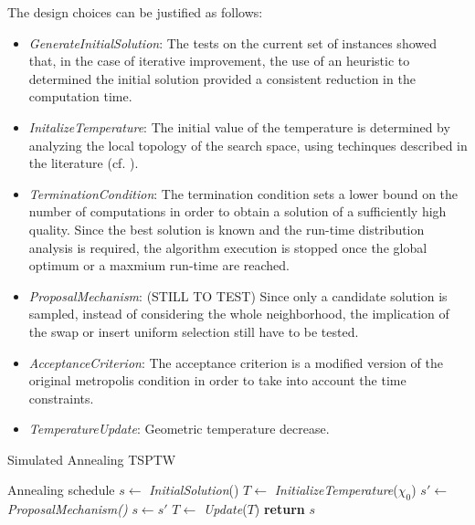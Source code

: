 \begin{homeworkProblem}
The design choices can be justified as follows:

\begin{itemize}
  \item \emph{GenerateInitialSolution}: The tests on the current set of instances showed that, in the case of iterative improvement, the use of an heuristic to determined the initial solution provided a consistent reduction in the computation time.
  \item \emph{InitalizeTemperature}: The initial value of the temperature is determined by analyzing the local topology of the search space, using techinques described in the literature (cf. \cite{ohlmann2007compressed}).
  \item \emph{TerminationCondition}: The termination condition sets a lower bound on the number of computations in order to obtain a solution of a sufficiently high quality.
  Since the best solution is known and the run-time distribution analysis is required, the algorithm execution is stopped once the global optimum or a maxmium run-time are reached.
  \item \emph{ProposalMechanism}: (STILL TO TEST) Since only a candidate solution is sampled, instead of considering the whole neighborhood, the implication of the swap or insert uniform selection still have to be tested.
  \item \emph{AcceptanceCriterion}: The acceptance criterion is a modified version of the original metropolis condition in order to take into account the time constraints.
  \item \emph{TemperatureUpdate}: Geometric temperature decrease.
\end{itemize}


\begin{algorithm}
\caption{Simulated Annealing TSPTW}
\label{SA:TSPTW}
\begin{algorithmic}
  \Require Annealing schedule
  \State $s \gets$ \emph{InitialSolution}()
  \State $T \gets$ \emph{InitializeTemperature}($\chi_0$) 
    \State $s' \gets$ \emph{ProposalMechanism()} 
      \State $s \gets s'$
    \EndIf
  \State $T \gets$ \emph{Update}($T$) 
\EndWhile
  \State \textbf{return} $s$
\EndProcedure
\end{algorithmic}
\end{algorithm}


\end{homeworkProblem}
